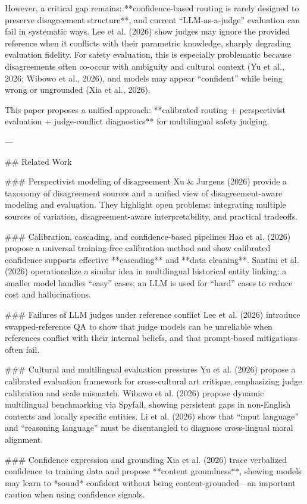 However, a critical gap remains: **confidence-based routing is rarely designed to preserve disagreement structure**, and current “LLM-as-a-judge” evaluation can fail in systematic ways. Lee et al. (2026) show judges may ignore the provided reference when it conflicts with their parametric knowledge, sharply degrading evaluation fidelity. For safety evaluation, this is especially problematic because disagreements often co-occur with ambiguity and cultural context (Yu et al., 2026; Wibowo et al., 2026), and models may appear “confident” while being wrong or ungrounded (Xia et al., 2026).

This paper proposes a unified approach: **calibrated routing + perspectivist evaluation + judge-conflict diagnostics** for multilingual safety judging.

---

## Related Work  

### Perspectivist modeling of disagreement  
Xu & Jurgens (2026) provide a taxonomy of disagreement sources and a unified view of disagreement-aware modeling and evaluation. They highlight open problems: integrating multiple sources of variation, disagreement-aware interpretability, and practical tradeoffs.

### Calibration, cascading, and confidence-based pipelines  
Hao et al. (2026) propose a universal training-free calibration method and show calibrated confidence supports effective **cascading** and **data cleaning**. Santini et al. (2026) operationalize a similar idea in multilingual historical entity linking: a smaller model handles “easy” cases; an LLM is used for “hard” cases to reduce cost and hallucinations.

### Failures of LLM judges under reference conflict  
Lee et al. (2026) introduce swapped-reference QA to show that judge models can be unreliable when references conflict with their internal beliefs, and that prompt-based mitigations often fail.

### Cultural and multilingual evaluation pressures  
Yu et al. (2026) propose a calibrated evaluation framework for cross-cultural art critique, emphasizing judge calibration and scale mismatch. Wibowo et al. (2026) propose dynamic multilingual benchmarking via Spyfall, showing persistent gaps in non-English contexts and locally specific entities. Li et al. (2026) show that “input language” and “reasoning language” must be disentangled to diagnose cross-lingual moral alignment.

### Confidence expression and grounding  
Xia et al. (2026) trace verbalized confidence to training data and propose **content groundness**, showing models may learn to *sound* confident without being content-grounded—an important caution when using confidence signals.

